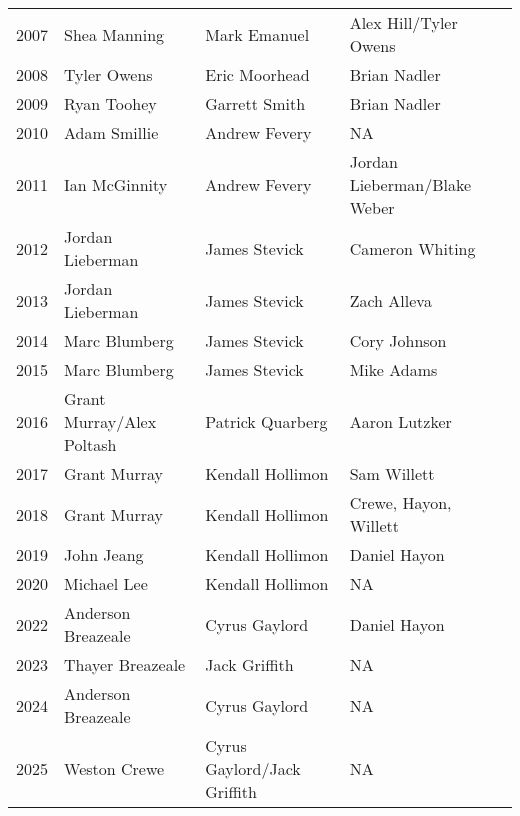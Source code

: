 \begin{table}[htbp]
\begin{tabular}{c l l l}
            2007 & Shea Manning & Mark Emanuel & Alex Hill/Tyler Owens \\
            2008 & Tyler Owens & Eric Moorhead & Brian Nadler \\
            2009 & Ryan Toohey & Garrett Smith & Brian Nadler \\
            2010 & Adam Smillie & Andrew Fevery & NA \\
            2011 & Ian McGinnity & Andrew Fevery & Jordan Lieberman/Blake Weber \\
            2012 & Jordan Lieberman & James Stevick & Cameron Whiting \\
            2013 & Jordan Lieberman & James Stevick & Zach Alleva \\
            2014 & Marc Blumberg & James Stevick & Cory Johnson \\
            2015 & Marc Blumberg & James Stevick & Mike Adams \\
            2016 & Grant Murray/Alex Poltash & Patrick Quarberg & Aaron Lutzker \\
            2017 & Grant Murray & Kendall Hollimon & Sam Willett \\
            2018 & Grant Murray & Kendall Hollimon & Crewe, Hayon, Willett \\
            2019 & John Jeang & Kendall Hollimon & Daniel Hayon \\
            2020 & Michael Lee & Kendall Hollimon & NA \\
            2022 & Anderson Breazeale & Cyrus Gaylord & Daniel Hayon \\
            2023 & Thayer Breazeale & Jack Griffith & NA \\
            2024 & Anderson Breazeale & Cyrus Gaylord & NA \\
            2025 & Weston Crewe & Cyrus Gaylord/Jack Griffith & NA \\
            \bottomrule
            \end{tabular}
            \end{table}
        
